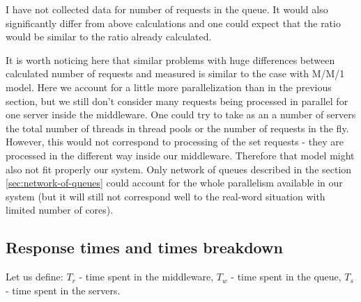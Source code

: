 \documentclass[11pt]{article}
\begin{document}
I have not collected data for number of requests in the queue. It would also significantly differ from above calculations and one could expect that the ratio would be similar to the ratio already calculated.


It is worth noticing here that similar problems with huge differences between calculated number of requests and measured is similar to the case with M/M/1 model. Here we account for a little more parallelization than in the previous section, but we still don't consider many requests being processed in parallel for one server inside the middleware. One could try to take as an a number of servers the total number of threads in thread pools or the number of requests in the fly. However, this would not correspond to processing of the set requests - they are processed in the different way inside our middleware. Therefore that model might also not fit properly our system. Only network of queues described in the section \ref{sec:network-of-queues} could account for the whole parallelism available in our system (but it will still not correspond well to the real-word situation with limited number of cores).



\subsection{Response times and times breakdown}

Let us define: 
$T_r$ - time spent in the middleware, $T_w$ - time spent in the queue, $T_s$ - time spent in the servers. 
\end{document}
